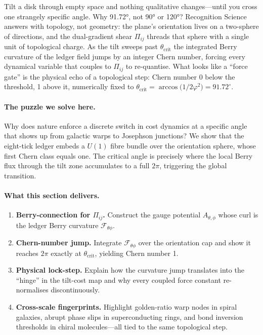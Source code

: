 \documentclass[11pt,oneside]{book}
\begin{document}
Tilt a disk through empty space and nothing qualitative changes—until
you cross one strangely specific angle.  
Why 91.72°, not 90° or 120°?  
Recognition Science answers with topology, not geometry: the plane’s
orientation lives on a two-sphere of directions, and the dual-gradient
shear \(\Pi_{ij}\) threads that sphere with a single unit of
topological charge.  
As the tilt sweeps past \(\theta_{\text{crit}}\) the integrated Berry
curvature of the ledger field jumps by an integer Chern number,
forcing every dynamical variable that couples to \(\Pi_{ij}\) to
re-quantise.  
What looks like a “force gate” is the physical echo of a
topological step: Chern number 0 below the threshold, 1 above it,
numerically fixed to \(\theta_{\text{crit}}
 = \arccos\!\bigl(1/2\varphi^{2}\bigr)=91.72^{\circ}\).

\paragraph{The puzzle we solve here.}
Why does nature enforce a discrete switch in cost dynamics at a
specific angle that shows up from galactic warps to Josephson
junctions?  
We show that the eight-tick ledger embeds a \(U(1)\) fibre bundle over
the orientation sphere, whose first Chern class equals one.  
The critical angle is precisely where the local Berry flux through the
tilt zone accumulates to a full \(2\pi\), triggering the global
transition.

\paragraph{What this section delivers.}

\begin{enumerate}[label=\arabic*.,leftmargin=*,itemsep=3pt]
\item \textbf{Berry-connection for \(\Pi_{ij}\).}  
      Construct the gauge potential \(A_{\theta,\phi}\) whose curl is
      the ledger Berry curvature \(\mathcal F_{\theta\phi}\).
\item \textbf{Chern-number jump.}  
      Integrate \(\mathcal F_{\theta\phi}\) over the orientation cap
      and show it reaches \(2\pi\) exactly at
      \(\theta_{\text{crit}}\), yielding Chern number 1.
\item \textbf{Physical lock-step.}  
      Explain how the curvature jump translates into the “hinge”
      in the tilt-cost map and why every coupled force constant
      re-normalises discontinuously.
\item \textbf{Cross-scale fingerprints.}  
      Highlight golden-ratio warp nodes in spiral galaxies, abrupt
      phase slips in superconducting rings, and bond inversion
      thresholds in chiral molecules—all tied to the same topological
      step.
\end{enumerate}
\end{document}
